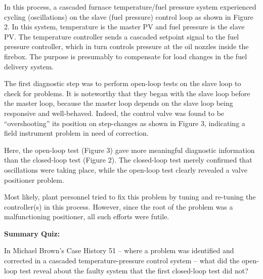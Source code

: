 












In this process, a cascaded furnace temperature/fuel pressure system experienced cycling (oscillations) on the slave (fuel pressure) control loop as shown in Figure 2.  In this system, temperature is the master PV and fuel pressure is the slave PV.  The temperature controller sends a cascaded setpoint signal to the fuel pressure controller, which in turn controls pressure at the oil nozzles inside the firebox.  The purpose is presumably to compensate for load changes in the fuel delivery system.

\vskip 10pt

The first diagnostic step was to perform open-loop tests on the slave loop to check for problems.  It is noteworthy that they began with the slave loop before the master loop, because the master loop depends on the slave loop being responsive and well-behaved.  Indeed, the control valve was found to be ``overshooting'' its position on step-changes as shown in Figure 3, indicating a field instrument problem in need of correction.

Here, the open-loop test (Figure 3) gave more meaningful diagnostic information than the closed-loop test (Figure 2).  The closed-loop test merely confirmed that oscillations were taking place, while the open-loop test clearly revealed a valve positioner problem.

\vskip 10pt

Most likely, plant personnel tried to fix this problem by tuning and re-tuning the controller(s) in this process.  However, since the root of the problem was a malfunctioning positioner, all such efforts were futile.





\vfil \eject

\noindent
{\bf Summary Quiz:}

In Michael Brown's Case History 51 -- where a problem was identified and corrected in a cascaded temperature-pressure control system -- what did the open-loop test reveal about the faulty system that the first closed-loop test did not?

